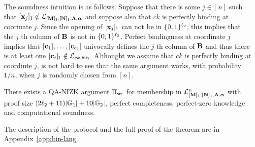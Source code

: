 The soundness intuition is as follows. Suppose that there is some $j\in[n]$ such that $[\mathbf{x}_j]_1\notin{\mathcal{L}_{[\mathbf{{M}}]_1,[\mathbf{{N}}]_1,\mathbf{{\Lambda}},{\boldsymbol \alpha}}}$ and suppose also that $ck$ is perfectly binding at coorinate $j$. Since the opening of $[\mathbf{x}_j]_1$ can not be in $\{0,1\}^{\ell_2}$, this implies that the $j$ th column of $\mathbf{{B}}$ is not in $\{0,1\}^{\ell_2}$. Perfect bindingness at coordinate $j$ implies that $[\mathbf{c}_1],\ldots,[\mathbf{c}_{\ell_2}]$ univocally defines the $j$ th column of $\mathbf{{B}}$ and thus there is at least one $[\mathbf{c}_i]_1\notin\mathcal{L}_{ck,\mathsf{bits}}$. Althought we assume that $ck$ is perfectly binding at coordinte $j$, is not hard to see that the same argument works, with probability $1/n$, when $j$ is randomly chosen from $[n]$. 
 \begin{theorem} \label{theo:aggset} There exists a QA-NIZK argument $\Pi_{\mathsf{set}}$ for membership in $\mathcal{L}_{[\mathbf{{M}}]_1,[\mathbf{{N}}]_1,\mathbf{{\Lambda}},{\boldsymbol \alpha}}^n$ with proof size  $(2{\ell_2}+11)|\mathbb{G}_1|+10|\mathbb{G}_2|$, perfect completeness, perfect-zero knowledge and computational soundness. 
\end{theorem}

The description of the protocol and the full proof of the theorem are in Appendix~\ref{app:bin-lang}.

